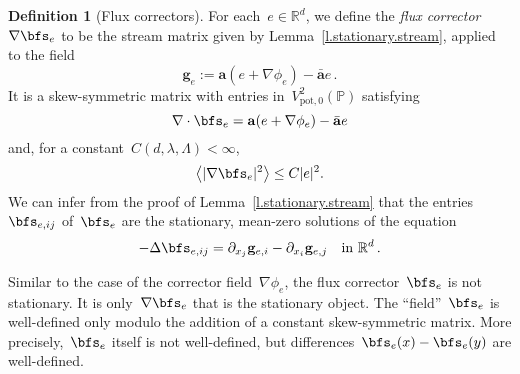 \documentclass[11pt,twoside]{article} %
\numberwithin{equation}{section}
\theoremstyle{definition}
\newtheorem{definition}[theorem]{Definition}
\newcommand*{\Rd}{\ensuremath{\mathbb{R}^d}}
\newcommand{\g}{\mathbf{g}}
\newcommand{\pot}{\mathrm{pot}}
\renewcommand{\a}{\mathbf{a}}
\newcommand{\ahom}{\bar{\a}}
\renewcommand{\P}{\mathbb{P}}
\begin{document}
 
\begin{definition}[Flux correctors]
For each~$e\in\Rd$, we define the \emph{flux corrector}~$\nabla \bfs_{e}$ to be the stream matrix given by Lemma~\ref{l.stationary.stream}, applied to the field
\begin{equation}
\label{e.ge.def}
\g_e := \a(e+\nabla \phi_e) - \ahom e \,.
\end{equation}
It is a skew-symmetric matrix with entries in~$V^2_{\pot,0}(\P)$ satisfying
\begin{equation}
\label{e.fluxcorrect.yes}
\nabla \cdot \bfs_e = \a(e+\nabla \phi_e) - \ahom e
\end{equation}
and, for a constant~$C(d,\lambda,\Lambda)<\infty$, 
\begin{equation}
\big\langle | \nabla \bfs_{e} |^2 \big\rangle 
\leq C|e|^2. 
\end{equation}
We can infer from the proof of Lemma~\ref{l.stationary.stream} that the entries~$\bfs_{e,ij}$ of~$\bfs_e$ are the stationary, mean-zero solutions of the equation
\begin{equation}
\label{e.flux.se.eq}
-\Delta \bfs_{e,ij}
=
\partial_{x_j} \g_{e,i}
-
\partial_{x_i} \g_{e,j}
\quad \mbox{in} \ \Rd
\,.
\end{equation}
\end{definition}
Similar to the case of the corrector field~$\nabla\phi_e$, the flux corrector~$\bfs_e$ is not stationary. It is only~$\nabla \bfs_e$ that is the stationary object. The ``field''~$\bfs_e$ is well-defined only modulo the addition of a constant skew-symmetric matrix. More precisely,~$\bfs_e$ itself is not well-defined, but differences~$\bfs_e(x) - \bfs_e(y)$ are well-defined. 

\smallskip
\end{document}
